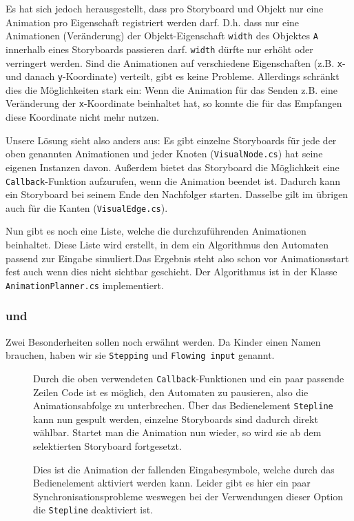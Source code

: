 Es hat sich jedoch herausgestellt, dass pro Storyboard und Objekt nur eine
Animation pro  Eigenschaft registriert werden darf. D.h. dass nur eine
Animationen (Veränderung) der Objekt-Eigenschaft \texttt{width} des Objektes \texttt{A}
innerhalb eines Storyboards passieren darf.  \texttt{width} dürfte nur erhöht oder
verringert werden. Sind die Animationen auf verschiedene Eigenschaften (z.B. \texttt{x}-
und danach  \texttt{y}-Koordinate) verteilt, gibt es keine Probleme. Allerdings schränkt
dies die Möglichkeiten stark ein: Wenn die Animation für das Senden z.B. eine
Veränderung der \texttt{x}-Koordinate beinhaltet hat, so konnte die für das Empfangen
diese Koordinate nicht mehr nutzen.

Unsere Lösung sieht also anders aus: Es gibt einzelne Storyboards für jede der
oben genannten Animationen und jeder Knoten (\texttt{VisualNode.cs}) hat seine eigenen
Instanzen davon. Außerdem bietet das Storyboard die Möglichkeit eine
\texttt{Callback}-Funktion aufzurufen, wenn die Animation beendet ist. Dadurch kann ein
Storyboard bei seinem Ende den Nachfolger starten. Dasselbe gilt im übrigen
auch für die Kanten (\texttt{VisualEdge.cs}).

Nun gibt es noch eine Liste, welche die durchzuführenden Animationen
beinhaltet. Diese Liste wird erstellt, in dem ein Algorithmus den Automaten
passend zur Eingabe simuliert.Das Ergebnis steht also schon vor Animationsstart
fest auch wenn dies nicht sichtbar geschieht. Der Algorithmus ist in der Klasse
\texttt{AnimationPlanner.cs} implementiert.

\subsubsection{ und \label{sec:3:3:1}}

Zwei Besonderheiten sollen noch erwähnt werden. Da Kinder einen Namen brauchen,
haben wir sie \texttt{Stepping} und \texttt{Flowing input} genannt.

\begin{description}
	\item [] Durch die oben verwendeten
		\texttt{Callback}-Funktionen und ein paar passende Zeilen Code ist es
		möglich, den Automaten zu pausieren, also die Animationsabfolge zu
		unterbrechen. Über das Bedienelement \texttt{Stepline} kann nun
		\glqq{}gespult\grqq{} werden, einzelne Storyboards sind dadurch direkt
		wählbar. Startet man die Animation nun wieder, so wird sie ab dem
		selektierten Storyboard fortgesetzt.

	\item [] Dies ist die Animation der \glqq{}fallenden\grqq{}
		Eingabesymbole, welche durch das Bedienelement 
		aktiviert werden kann. Leider gibt es hier ein paar
		Synchronisationsprobleme weswegen bei der Verwendungen dieser Option
		die \texttt{Stepline} deaktiviert ist.
\end{description}

